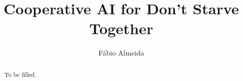 \documentclass{llncs}
\begin{document}
\title{Cooperative AI for Don't Starve Together}
\author{Fábio Almeida}

\maketitle

\begin{abstract}
To be filled.
\end{abstract}




\end{document}
